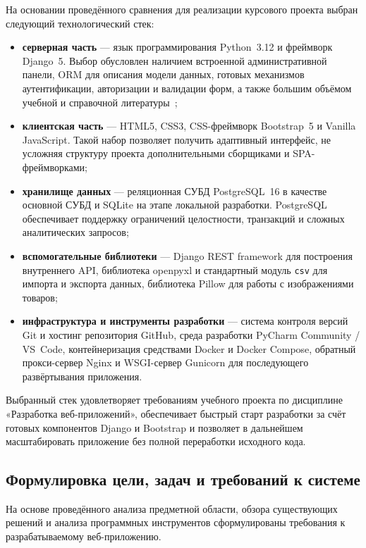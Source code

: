 \documentclass[14pt, a4paper]{extarticle}
\begin{document}
На основании проведённого сравнения для реализации курсового проекта выбран следующий технологический стек:
\begin{itemize}
    \item \textbf{серверная часть} --- язык программирования Python~3.12 и фреймворк Django~5. Выбор обусловлен наличием встроенной административной панели, ORM для описания модели данных, готовых механизмов аутентификации, авторизации и валидации форм, а также большим объёмом учебной и справочной литературы~\cite{hawkins2022django};
    \item \textbf{клиентская часть} --- HTML5, CSS3, CSS-фреймворк Bootstrap~5 и Vanilla JavaScript. Такой набор позволяет получить адаптивный интерфейс, не усложняя структуру проекта дополнительными сборщиками и SPA-фреймворками;
    \item \textbf{хранилище данных} --- реляционная СУБД PostgreSQL~16 в качестве основной СУБД и SQLite на этапе локальной разработки. PostgreSQL обеспечивает поддержку ограничений целостности, транзакций и сложных аналитических запросов;
    \item \textbf{вспомогательные библиотеки} --- Django REST framework для построения внутреннего API, библиотека openpyxl и стандартный модуль \texttt{csv} для импорта и экспорта данных, библиотека Pillow для работы с изображениями товаров;
    \item \textbf{инфраструктура и инструменты разработки} --- система контроля версий Git и хостинг репозитория GitHub, среда разработки PyCharm Community / VS~Code, контейнеризация средствами Docker и Docker Compose, обратный прокси-сервер Nginx и WSGI-сервер Gunicorn для последующего развёртывания приложения.
\end{itemize}

Выбранный стек удовлетворяет требованиям учебного проекта по дисциплине «Разработка веб-приложений», обеспечивает быстрый старт разработки за счёт готовых компонентов Django и Bootstrap и позволяет в дальнейшем масштабировать приложение без полной переработки исходного кода.

\subsection{Формулировка цели, задач и требований к системе}

На основе проведённого анализа предметной области, обзора существующих решений и анализа программных инструментов сформулированы требования к разрабатываемому веб-приложению.
\end{document}
